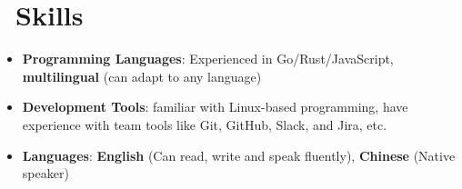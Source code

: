 \documentclass{resume}
\newcommand{\en}[1]{#1}
\newcommand{\zh}[1]{}
\begin{document}
\section{\faCogs\ \en{Skills}\zh{技能}}
\begin{itemize}[parsep=0.25ex]
      \item \en{\textbf{Programming Languages}:
                  Experienced in Go/Rust/JavaScript,
                  \textbf{multilingual} (can adapt to any language)}
            \zh{\textbf{编程语言}:
                  熟悉 Go/Rust/JavaScript，
                  \textbf{泛语言}（编程不受特定语言限制）}

      \item \en{\textbf{Development Tools}:
                  familiar with Linux-based programming,
                  have experience with team tools like Git, GitHub, Slack, and Jira, etc.}
            \zh{\textbf{开发工具}:
                  熟悉 Linux，有 Git、GitHub、Slack 和 Jira 等团队协作工具的使用经验}

      \item \en{\textbf{Languages}:
                  \textbf{English} (Can read, write and speak fluently),
                  \textbf{Chinese} (Native speaker)}
            \zh{\textbf{语言}:
                  \textbf{英语} （可以流利的听说读写），
                  \textbf{中文} （母语）}
\end{itemize}
\end{document}
